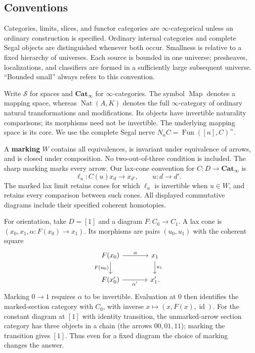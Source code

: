 \documentclass[oneside]{article}
\theoremstyle{plain}
\theoremstyle{definition}
\theoremstyle{remark}
\newcommand{\Cat}{\mathbf{Cat}_{\infty}}
\newcommand{\Fun}{\operatorname{Fun}}
\newcommand{\Map}{\operatorname{Map}}
\newcommand{\Nat}{\operatorname{Nat}}
\newcommand{\Sps}{\mathcal S}
\newcommand{\core}{\simeq}
\newcommand{\id}{\operatorname{id}}
\begin{document}
\subsection{Conventions}\label{subsec:conventions}

Categories, limits, slices, and functor categories are $\infty$-categorical
unless an ordinary construction is specified. Ordinary internal categories and complete Segal objects are distinguished
whenever both occur.
Smallness is relative to a fixed hierarchy of universes. Each source is
bounded in one universe; presheaves, localizations, and classifiers are
formed in a sufficiently large subsequent universe. ``Bounded small''
always refers to this convention.

Write $\Sps$ for spaces and $\Cat$ for $\infty$-categories. The symbol
$\Map$ denotes a mapping space, whereas $\Nat(A,K)$ denotes the full
$\infty$-category of ordinary natural transformations and modifications.
Its objects have invertible naturality comparisons; its morphisms need not
be invertible. The underlying mapping space is its core. We use the complete
Segal nerve $N_nC=\Fun([n],C)^\core$.

A \textbf{marking} $W$ contains all equivalences, is invariant under equivalence
of arrows, and is closed under composition. No two-out-of-three condition is
included. The sharp marking marks every arrow. Our lax-cone convention for
$C:D\to\Cat$ is
\[
 \ell_u:C(u)x_d\longrightarrow x_{d'},\qquad u:d\to d'.
\]
The marked lax limit retains cones for which $\ell_u$ is invertible when
$u\in W$, and retains every comparison between such cones. All displayed
commutative diagrams include their specified coherent homotopies.

For orientation, take $D=[1]$ and a diagram $F:C_0\to C_1$.
A lax cone is $(x_0,x_1,\alpha:F(x_0)\to x_1)$. Its morphisms are
pairs $(u_0,u_1)$ with the coherent square
\[
\begin{tikzcd}[column sep=large]
 F(x_0)\ar[r,"\alpha"]\ar[d,"F(u_0)"']&x_1\ar[d,"u_1"]\\
 F(x'_0)\ar[r,"\alpha'"']&x'_1.
\end{tikzcd}
\]
Marking $0\to1$ requires $\alpha$ to be invertible. Evaluation at $0$
then identifies the marked-section category with $C_0$, with inverse
$x\mapsto(x,F(x),\id)$. For the constant diagram at $[1]$ with identity transition, the
unmarked-arrow section category has three objects in a chain
(the arrows $00,01,11$); marking the transition gives $[1]$.
Thus even for a fixed diagram the choice of marking changes the answer.
\end{document}
